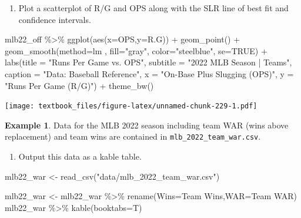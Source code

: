 \documentclass[
  11pt,
]{book}
\newenvironment{Shaded}{\begin{snugshade}}{\end{snugshade}}
\newcommand{\AttributeTok}[1]{\textcolor[rgb]{0.77,0.63,0.00}{#1}}
\newcommand{\ConstantTok}[1]{\textcolor[rgb]{0.00,0.00,0.00}{#1}}
\newcommand{\FunctionTok}[1]{\textcolor[rgb]{0.00,0.00,0.00}{#1}}
\newcommand{\NormalTok}[1]{#1}
\newcommand{\OtherTok}[1]{\textcolor[rgb]{0.56,0.35,0.01}{#1}}
\newcommand{\SpecialCharTok}[1]{\textcolor[rgb]{0.00,0.00,0.00}{#1}}
\newcommand{\StringTok}[1]{\textcolor[rgb]{0.31,0.60,0.02}{#1}}
\providecommand{\tightlist}{%
  \setlength{\itemsep}{0pt}\setlength{\parskip}{0pt}}
\theoremstyle{definition}
\theoremstyle{definition}
\newtheorem{example}{Example}[chapter]
\theoremstyle{definition}
\theoremstyle{definition}
\theoremstyle{remark}
\begin{document}
\newpage

\begin{enumerate}
\def\labelenumi{(\alph{enumi})}
\setcounter{enumi}{5}
\tightlist
\item
  Plot a scatterplot of R/G and OPS along with the SLR line of best fit and confidence intervals.
\end{enumerate}

\begin{Shaded}
\begin{Highlighting}[]
\NormalTok{mlb22\_off }\SpecialCharTok{\%\textgreater{}\%} \FunctionTok{ggplot}\NormalTok{(}\FunctionTok{aes}\NormalTok{(}\AttributeTok{x=}\NormalTok{OPS,}\AttributeTok{y=}\NormalTok{R.G)) }\SpecialCharTok{+} \FunctionTok{geom\_point}\NormalTok{() }\SpecialCharTok{+}
  \FunctionTok{geom\_smooth}\NormalTok{(}\AttributeTok{method=}\NormalTok{lm , }\AttributeTok{fill=}\StringTok{"gray"}\NormalTok{, }\AttributeTok{color=}\StringTok{"steelblue"}\NormalTok{, }\AttributeTok{se=}\ConstantTok{TRUE}\NormalTok{) }\SpecialCharTok{+}
  \FunctionTok{labs}\NormalTok{(}\AttributeTok{title =} \StringTok{"Runs Per Game vs. OPS"}\NormalTok{,}
       \AttributeTok{subtitle =} \StringTok{"2022 MLB Season | Teams"}\NormalTok{,}
       \AttributeTok{caption =} \StringTok{"Data: Baseball Reference"}\NormalTok{, }
       \AttributeTok{x =} \StringTok{"On{-}Base Plus Slugging (OPS)"}\NormalTok{,}
       \AttributeTok{y =} \StringTok{"Runs Per Game (R/G)"}\NormalTok{) }\SpecialCharTok{+}
  \FunctionTok{theme\_bw}\NormalTok{()}
\end{Highlighting}
\end{Shaded}

\texttt{[image: textbook\_files/figure-latex/unnamed-chunk-229-1.pdf]}

\newpage

\begin{example}
Data for the MLB 2022 season including team WAR (wins above replacement) and team wins are contained in \texttt{mlb\_2022\_team\_war.csv}.
\end{example}

\begin{enumerate}
\def\labelenumi{(\alph{enumi})}
\tightlist
\item
  Output this data as a kable table.
\end{enumerate}

\begin{Shaded}
\begin{Highlighting}[]
\NormalTok{mlb22\_war }\OtherTok{\textless{}{-}} \FunctionTok{read\_csv}\NormalTok{(}\StringTok{"data/mlb\_2022\_team\_war.csv"}\NormalTok{)}

\NormalTok{mlb22\_war }\OtherTok{\textless{}{-}}\NormalTok{ mlb22\_war }\SpecialCharTok{\%\textgreater{}\%} \FunctionTok{rename}\NormalTok{(}\AttributeTok{Wins=}\StringTok{\textasciigrave{}}\AttributeTok{Team Wins}\StringTok{\textasciigrave{}}\NormalTok{,}\AttributeTok{WAR=}\StringTok{\textasciigrave{}}\AttributeTok{Team WAR}\StringTok{\textasciigrave{}}\NormalTok{)}
\NormalTok{mlb22\_war }\SpecialCharTok{\%\textgreater{}\%} \FunctionTok{kable}\NormalTok{(}\AttributeTok{booktabs=}\NormalTok{T)}
\end{Highlighting}
\end{Shaded}
\end{document}
